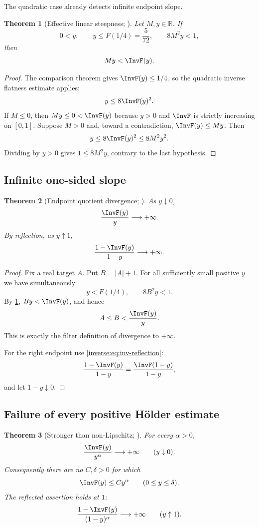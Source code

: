 \documentclass[11pt,oneside]{article}
\newtheorem{theorem}{Theorem}[section]
\theoremstyle{definition}
\theoremstyle{remark}
\newcommand{\R}{\mathbb R}
\begin{document}
The quadratic case already detects infinite endpoint slope.

\begin{theorem}[Effective linear steepness; \Formalized]
\label{inverse:thm:effective-linear}
Let $M,y\in\R$.  If
\[
 0<y,\qquad y\leq F(1/4)=\frac5{72},\qquad
 8M^2y<1,
\]
then
\[
 My<\InvF(y).
\]
\end{theorem}

\begin{proof}
The comparison theorem gives $\InvF(y)\leq1/4$, so the quadratic inverse
flatness estimate applies:
\[
 y\leq8\InvF(y)^2. \label{inverse:eq:quadratic-inv}
\]
If $M\leq0$, then $My\leq0<\InvF(y)$ because $y>0$ and $\InvF$ is strictly
increasing on $[0,1]$.  Suppose $M>0$ and, toward a contradiction,
$\InvF(y)\leq My$.  Then
\[
 y\leq8\InvF(y)^2\leq8M^2y^2.
\]
Dividing by $y>0$ gives $1\leq8M^2y$, contrary to the last hypothesis.
\end{proof}

\subsection{Infinite one-sided slope}

\begin{theorem}[Endpoint quotient divergence; \Formalized]
\label{inverse:thm:inverse-quotient}
As $y\downarrow0$,
\[
 \frac{\InvF(y)}{y}\longrightarrow+\infty.
\]
By reflection, as $y\uparrow1$,
\[
 \frac{1-\InvF(y)}{1-y}\longrightarrow+\infty.
\]
\end{theorem}

\begin{proof}
Fix a real target $A$.  Put $B=|A|+1$.  For all sufficiently small
positive $y$ we have simultaneously
\[
 y<F(1/4),\qquad 8B^2y<1.
\]
By \cref{inverse:thm:effective-linear}, $By<\InvF(y)$, and hence
\[
 A\leq B<\frac{\InvF(y)}y.
\]
This is exactly the filter definition of divergence to $+\infty$.

For the right endpoint use \eqref{inverse:eq:inv-reflection}:
\[
 \frac{1-\InvF(y)}{1-y}
 =\frac{\InvF(1-y)}{1-y},
\]
and let $1-y\downarrow0$.
\end{proof}

\subsection{Failure of every positive Hölder estimate}

\begin{theorem}[Stronger than non-Lipschitz; \Derived]
\label{inverse:thm:no-holder}
For every $\alpha>0$,
\[
 \frac{\InvF(y)}{y^\alpha}\longrightarrow+\infty
 \qquad (y\downarrow0).
\]
Consequently there are no $C,\delta>0$ for which
\[
 \InvF(y)\leq Cy^\alpha\qquad(0\leq y\leq\delta).
\]
The reflected assertion holds at $1$:
\[
 \frac{1-\InvF(y)}{(1-y)^\alpha}\longrightarrow+\infty
 \qquad (y\uparrow1).
\]
\end{theorem}
\end{document}
